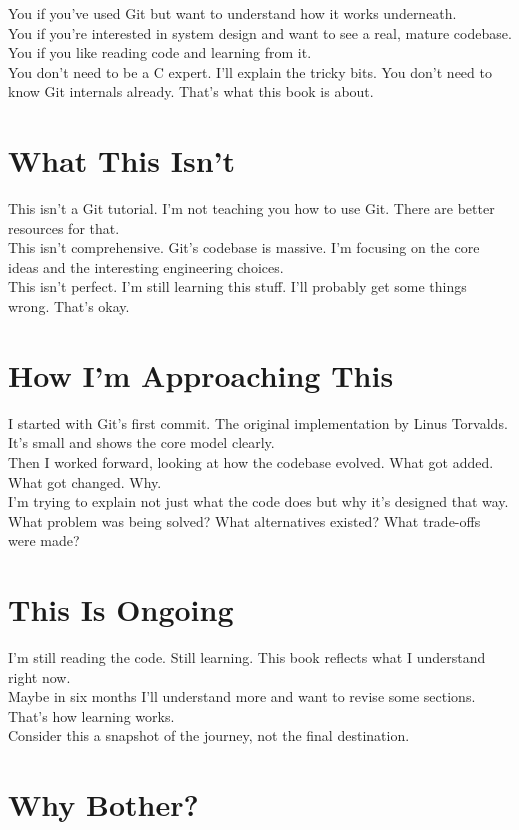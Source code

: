 You if you've used Git but want to understand how it works underneath.\\
You if you're interested in system design and want to see a real, mature codebase.\\
You if you like reading code and learning from it.\\
You don't need to be a C expert. I'll explain the tricky bits. You don't need to know Git internals already. That's what this book is about.

\section*{What This Isn't}

This isn't a Git tutorial. I'm not teaching you how to use Git. There are better resources for that.\\
This isn't comprehensive. Git's codebase is massive. I'm focusing on the core ideas and the interesting engineering choices.\\
This isn't perfect. I'm still learning this stuff. I'll probably get some things wrong. That's okay.

\section*{How I'm Approaching This}

I started with Git's first commit. The original implementation by Linus Torvalds. It's small and shows the core model clearly.\\
Then I worked forward, looking at how the codebase evolved. What got added. What got changed. Why.\\
I'm trying to explain not just what the code does but why it's designed that way. What problem was being solved? What alternatives existed? What trade-offs were made?

\section*{This Is Ongoing}

I'm still reading the code. Still learning. This book reflects what I understand right now.\\
Maybe in six months I'll understand more and want to revise some sections. That's how learning works.\\
Consider this a snapshot of the journey, not the final destination.

\section*{Why Bother?}

